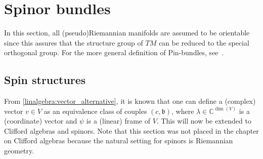 
\section{Spinor bundles}\label{section:spinor_bundles}

    In this section, all (pseudo)Riemannian manifolds are assumed to be orientable since this assures that the structure group of $TM$ can be reduced to the special orthogonal group. For the more general definition of $\mathrm{Pin}$-bundles, see~\citet{choquet-bruhat_analysis_2000}.

\subsection{Spin structures}

    From \cref{linalgebra:vector_alternative}, it is known that one can define a (complex) vector $v\in V$ as an equivalence class of couples $(c,\mathfrak{b})$, where $\lambda\in\mathbb{C}^{\dim(V)}$ is a (coordinate) vector and $\psi$ is a (linear) frame of $V$. This will now be extended to Clifford algebras and spinors. Note that this section was not placed in the chapter on Clifford algebras because the natural setting for spinors is Riemannian geometry.

